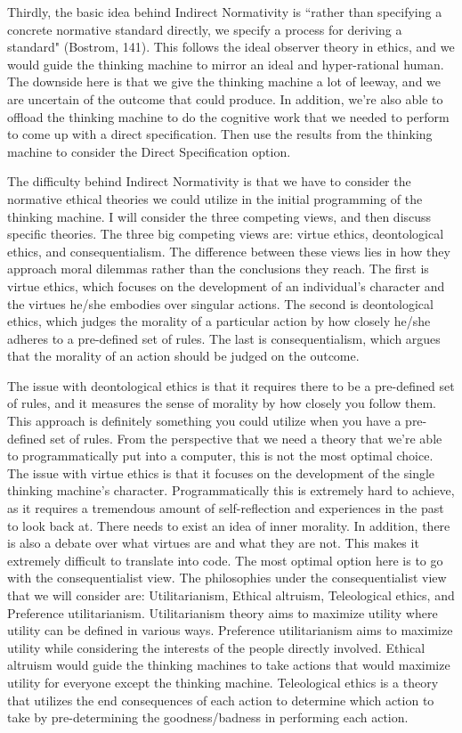 \documentclass[11pt, oneside]{article}
\begin{document}
\par 
Thirdly, the basic idea behind Indirect Normativity is ``rather than specifying a concrete normative standard directly, we specify a process for deriving a standard" (Bostrom, 141). This follows the ideal observer theory in ethics, and we would guide the thinking machine to mirror an ideal and hyper-rational human. 
The downside here is that we give the thinking machine a lot of leeway, and we are uncertain of the outcome that could produce. 
In addition, we're also able to offload the thinking machine to do the cognitive work that we needed to perform to come up with a direct specification. Then use the results from the thinking machine to consider the Direct Specification option.
\par 
The difficulty behind Indirect Normativity is that we have to consider the normative ethical theories we could utilize in the initial programming of the thinking machine. I will consider the three competing views, and then discuss specific theories. The three big competing views are: virtue ethics, deontological ethics, and consequentialism. The difference between these views lies in how they approach moral dilemmas rather than the conclusions they reach. 
The first is virtue ethics, which focuses on the development of an individual's character and the virtues he/she embodies over singular actions. The second is deontological ethics, which judges the morality of a particular action by how closely he/she adheres to a pre-defined set of rules. The last is consequentialism, which argues that the morality of an action should be judged on the outcome. 
\par 
The issue with deontological ethics is that it requires there to be a pre-defined set of rules, and it measures the sense of morality by how closely you follow them. This approach is definitely something you could utilize when you have a pre-defined set of rules. From the perspective that we need a theory that we're able to programmatically put into a computer, this is not the most optimal choice.
The issue with virtue ethics is that it focuses on the development of the single thinking machine's character. Programmatically this is extremely hard to achieve, as it requires a tremendous amount of self-reflection and experiences in the past to look back at. There needs to exist an idea of inner morality. In addition, there is also a debate over what virtues are and what they are not. This makes it extremely difficult to translate into code.
The most optimal option here is to go with the consequentialist view. The philosophies under the consequentialist view that we will consider are: Utilitarianism, Ethical altruism, Teleological ethics, and Preference utilitarianism. 
Utilitarianism theory aims to maximize utility where utility can be defined in various ways. 
Preference utilitarianism aims to maximize utility while considering the interests of the people directly involved. 
Ethical altruism would guide the thinking machines to take actions that would maximize utility for everyone except the thinking machine. 
Teleological ethics is a theory that utilizes the end consequences of each action to determine which action to take by pre-determining the goodness/badness in performing each action. 
\end{document}
